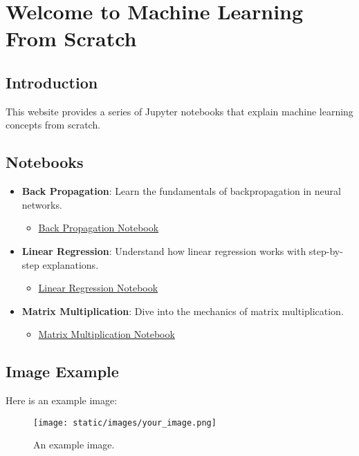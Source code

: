 \documentclass{article}
\begin{document}
\section*{Welcome to Machine Learning From Scratch}

\subsection*{Introduction}

This website provides a series of Jupyter notebooks that explain machine learning concepts from scratch.

\subsection*{Notebooks}

\begin{itemize}
    \item \textbf{Back Propagation}: Learn the fundamentals of backpropagation in neural networks.
    \begin{itemize}
        \item \href{/notebooks/StartingFromTheBasicsBackPropagation.ipynb}{Back Propagation Notebook}
    \end{itemize}
    \item \textbf{Linear Regression}: Understand how linear regression works with step-by-step explanations.
    \begin{itemize}
        \item \href{/notebooks/StartingFromTheBasicsLinearRegression.ipynb}{Linear Regression Notebook}
    \end{itemize}
    \item \textbf{Matrix Multiplication}: Dive into the mechanics of matrix multiplication.
    \begin{itemize}
        \item \href{/notebooks/StartingFromTheBasicsMatrixMultiplication.ipynb}{Matrix Multiplication Notebook}
    \end{itemize}
\end{itemize}

\subsection*{Image Example}

Here is an example image:

\begin{figure}[h]
    \centering
    \texttt{[image: static/images/your\_image.png]}
    \caption{An example image.}
\end{figure}
\end{document}

